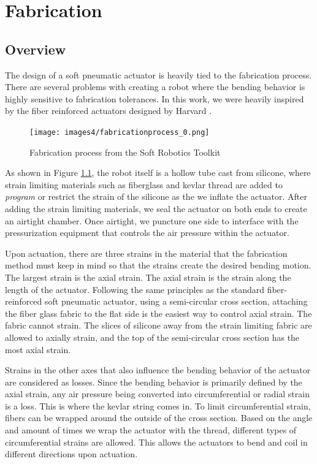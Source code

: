 \chapter{Fabrication}

\section{Overview}
The design of a soft pneumatic actuator is heavily tied to the fabrication process. There are several problems with creating a robot where the bending behavior is highly sensitive to fabrication tolerances. In this work, we were heavily inspired by the fiber reinforced actuators designed by Harvard \cite{galloway_mechanically_2013}. 

\begin{figure}[h]
    \centering
    \texttt{[image: images4/fabricationprocess\_0.png]}
    \caption{Fabrication process from the Soft Robotics Toolkit}
    \label{fig:toolkitfab}
\end{figure}

As shown in Figure \ref{fig:toolkitfab}, the robot itself is a hollow tube cast from silicone, where strain limiting materials such as fiberglass and kevlar thread are added to \emph{program} or restrict the strain of the silicone as the we inflate the actuator. After adding the strain limiting materials, we seal the actuator on both ends to create an airtight chamber. Once airtight, we puncture one side to interface with the pressurization equipment that controls the air pressure within the actuator. 

Upon actuation, there are three strains in the material that the fabrication method must keep in mind so that the strains create the desired bending motion. The largest strain is the axial strain. The axial strain is the strain along the length of the actuator. Following the same principles as the standard fiber-reinforced soft pneumatic actuator, using a semi-circular cross section, attaching the fiber glass fabric to the flat side is the easiest way to control axial strain. The fabric cannot strain. The slices of silicone away from the strain limiting fabric are allowed to axially strain, and the top of the semi-circular cross section has the most axial strain. 

Strains in the other axes that also influence the bending behavior of the actuator are considered as losses. Since the bending behavior is primarily defined by the axial strain, any air pressure being converted into circumferential or radial strain is a loss. This is where the kevlar string comes in. To limit circumferential strain, fibers can be wrapped around the outside of the cross section. Based on the angle and amount of times we wrap the actuator with the thread, different types of circumferential strains are allowed. This allows the actuators to bend and coil in different directions upon actuation. 

